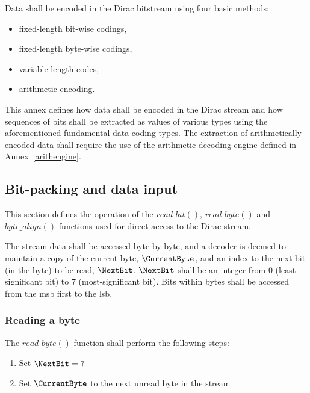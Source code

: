 
\label{dataenc}

Data shall be encoded in the Dirac bitstream using four basic methods: 
\begin{itemize}
\item fixed-length bit-wise codings,
\item fixed-length byte-wise codings,
\item variable-length codes,
\item arithmetic encoding.
\end{itemize}

This annex defines how data shall be encoded in the Dirac stream and how 
sequences of bits shall be extracted as values of various types using the 
aforementioned fundamental data coding types. The extraction of arithmetically
encoded data shall require the use of the arithmetic decoding engine defined in 
Annex~\ref{arithengine}.

\subsection{Bit-packing and data input}
\label{bitpacking}

This section defines the operation of the $read\_bit()$, $read\_byte()$ 
and $byte\_align()$ functions used for direct access to the Dirac stream.

The stream data shall be accessed byte by byte, and a decoder is deemed to 
maintain a copy of the current byte, $\CurrentByte$, and an index to the next 
bit (in the byte) to be read, $\NextBit$. $\NextBit$ shall be an integer from 0
 (least-significant bit) to 7 (most-significant bit). Bits within bytes shall be
 accessed from the msb first to the lsb.

\subsubsection{Reading a byte}

The $read\_byte()$ function shall perform the following steps:
\begin{enumerate}
\item Set $\NextBit=7$ 
\item Set $\CurrentByte$ to the next unread byte in the stream
\end{enumerate}

